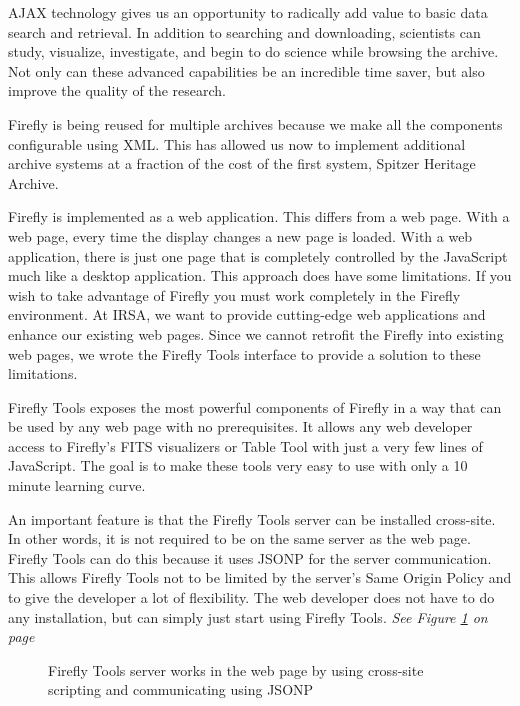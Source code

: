 AJAX technology gives us an opportunity to radically add value to basic data search and retrieval. 
In addition to searching and downloading, scientists can study, visualize, investigate, and begin to do science
while browsing the archive. Not only can these advanced capabilities be an incredible time saver, but also improve the quality of the research.

Firefly is being reused for multiple archives because we make all the components configurable using XML. This has allowed us now to implement additional archive systems at a fraction of the cost of the first system, Spitzer Heritage Archive.

Firefly is implemented as a web application. This differs from a web page.  
With a web page, every time the display changes a new page is loaded.  
With a web application, there is just one page that is completely controlled by the JavaScript much like a
desktop application.
This approach does have some limitations. 
If you wish to take advantage of Firefly you must work completely in the Firefly environment.  
At IRSA, we want to provide cutting-edge web applications and enhance our existing web pages.
Since we cannot retrofit the Firefly into existing web pages, we wrote the Firefly Tools interface to provide a solution to these limitations.

Firefly Tools exposes the most powerful components of Firefly in a way that can be used by any web page with no prerequisites. 
It allows any web developer access to Firefly's FITS visualizers or Table Tool with just a very few lines of JavaScript. 
The goal is to make these tools very easy to use with only a 10 minute learning curve.  

An important feature is that the Firefly Tools server can be installed cross-site. 
In other words, it is not required to be on the same server as the web page. 
Firefly Tools can do this because it uses JSONP for the server communication.  
This allows Firefly Tools not to be limited by the server's Same Origin Policy and to give the developer a lot of flexibility.
The web developer does not have to do any installation, but can simply just start using Firefly Tools.
\textit{See Figure \ref{server-chart} on page~\pageref{server-chart}}

\begin{figure}[!ht]
\caption{\small Firefly Tools server works in the web page by using cross-site scripting and communicating using JSONP}
\label{server-chart}
\end{figure}


